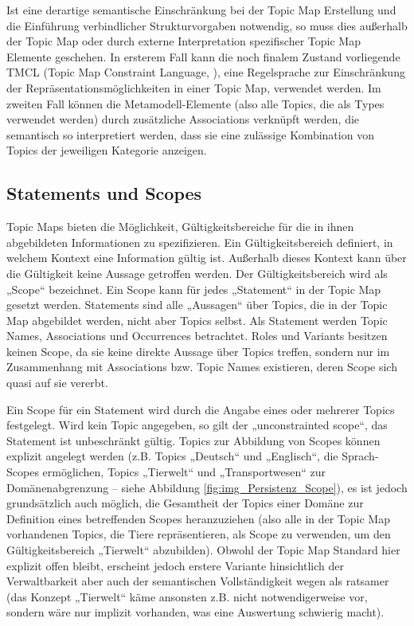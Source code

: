 Ist eine derartige semantische Einschränkung bei der Topic Map Erstellung und die Einführung verbindlicher Strukturvorgaben notwendig, so muss dies außerhalb der Topic Map oder durch externe Interpretation spezifischer Topic Map Elemente geschehen. In ersterem Fall kann die noch finalem Zustand vorliegende TMCL (Topic Map Constraint Language, \citep{TMCL08}), eine Regelsprache zur Einschränkung der Repräsentationsmöglichkeiten in einer Topic Map, verwendet werden. Im zweiten Fall können die Metamodell-Elemente (also alle Topics, die als Types verwendet werden) durch zusätzliche Associations verknüpft werden, die semantisch so interpretiert werden, dass sie eine zulässige Kombination von Topics der jeweiligen Kategorie anzeigen.


\subsection{Statements und Scopes} %
\label{sub:scopes}

Topic Maps bieten die Möglichkeit, Gültigkeitsbereiche für die in ihnen abgebildeten Informationen zu spezifizieren. Ein Gültigkeitsbereich definiert, in welchem Kontext eine Information gültig ist. Außerhalb dieses Kontext kann über die Gültigkeit keine Aussage getroffen werden. Der Gültigkeitsbereich wird als „Scope“ bezeichnet. Ein Scope kann für jedes „Statement“ in der Topic Map gesetzt werden. Statements sind alle „Aussagen“ über Topics, die in der Topic Map abgebildet werden, nicht aber Topics selbst. Als Statement werden Topic Names, Associations und Occurrences betrachtet. Roles und Variants besitzen keinen Scope, da sie keine direkte Aussage über Topics treffen, sondern nur im Zusammenhang mit Associations bzw. Topic Names existieren, deren Scope sich quasi auf sie vererbt.

Ein Scope für ein Statement wird durch die Angabe eines oder mehrerer Topics festgelegt. Wird kein Topic angegeben, so gilt der „unconstrainted scope“, das Statement ist unbeschränkt gültig. Topics zur Abbildung von Scopes können explizit angelegt werden (z.B. Topics „Deutsch“ und „Englisch“, die Sprach-Scopes ermöglichen, Topics „Tierwelt“ und „Transportwesen“ zur Domänenabgrenzung -- siehe Abbildung \ref{fig:img_Persistenz_Scope}), es ist jedoch grundsätzlich auch möglich, die Gesamtheit der Topics einer Domäne zur Definition eines betreffenden Scopes heranzuziehen (also alle in der Topic Map vorhandenen Topics, die Tiere repräsentieren, als Scope zu verwenden, um den Gültigkeitsbereich „Tierwelt“ abzubilden). Obwohl der Topic Map Standard hier explizit offen bleibt, erscheint jedoch erstere Variante hinsichtlich der Verwaltbarkeit aber auch der semantischen Vollständigkeit wegen als ratsamer (das Konzept „Tierwelt“ käme ansonsten z.B. nicht notwendigerweise vor, sondern wäre nur implizit vorhanden, was eine Auswertung schwierig macht).

